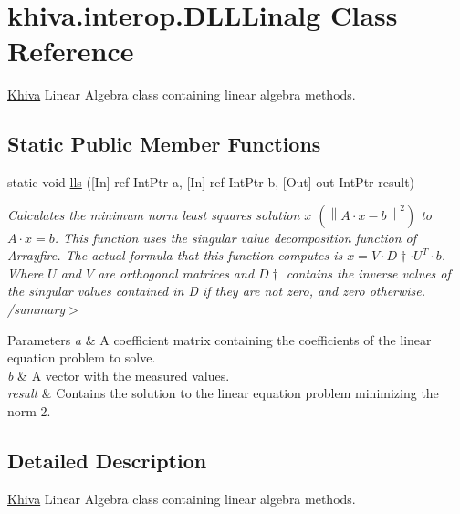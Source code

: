 \hypertarget{classkhiva_1_1interop_1_1_d_l_l_linalg}{}\section{khiva.\+interop.\+D\+L\+L\+Linalg Class Reference}
\label{classkhiva_1_1interop_1_1_d_l_l_linalg}


\mbox{\hyperlink{classkhiva_1_1_khiva}{Khiva}} Linear Algebra class containing linear algebra methods.  


\subsection*{Static Public Member Functions}
\begin{DoxyCompactItemize}
\item 
static void \mbox{\hyperlink{classkhiva_1_1interop_1_1_d_l_l_linalg_a051ddc162ebfe5f773c9e22149d4efad}{lls}} (\mbox{[}In\mbox{]} ref Int\+Ptr a, \mbox{[}In\mbox{]} ref Int\+Ptr b, \mbox{[}Out\mbox{]} out Int\+Ptr result)
\begin{DoxyCompactList}\small\item\em Calculates the minimum norm least squares solution $x$ $(\left\lVert{A·x - b}\right\rVert^2)$ to $A·x = b$. This function uses the singular value decomposition function of Arrayfire. The actual formula that this function computes is $x = V·D\dagger·U^T·b$. Where $U$ and $V$ are orthogonal matrices and $D\dagger$ contains the inverse values of the singular values contained in D if they are not zero, and zero otherwise. /summary$>$ 
\begin{DoxyParams}{Parameters}
{\em a} & A coefficient matrix containing the coefficients of the linear equation problem to solve.\\
\hline
{\em b} & A vector with the measured values.\\
\hline
{\em result} & Contains the solution to the linear equation problem minimizing the norm 2.\\
\hline
\end{DoxyParams}
\end{DoxyCompactList}\end{DoxyCompactItemize}


\subsection{Detailed Description}
\mbox{\hyperlink{classkhiva_1_1_khiva}{Khiva}} Linear Algebra class containing linear algebra methods. 




